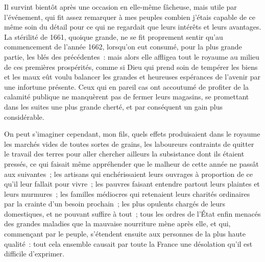 \documentclass[french,twoside]{book} %
\begin{document}
Il survint bientôt après une occasion en elle-même fâcheuse, mais utile par l’événement, qui fit assez remarquer à mes peuples combien j’étais capable de ce même soin du détail pour ce qui ne regardait que leurs intérêts et leurs avantages. La stérilité de 1661, quoique grande, ne se fit proprement sentir qu’au commencement de l’année 1662, lorsqu’on eut consumé, pour la plus grande partie, les blés des précédentes : mais alors elle affligea tout le royaume au milieu de ces premières prospérités, comme si Dieu qui prend soin de tempérer les biens et les maux eût voulu balancer les grandes et heureuses espérances de l’avenir par une infortune présente. Ceux qui en pareil cas ont accoutumé de profiter de la calamité publique ne manquèrent pas de fermer leurs magasins, se promettant dans les suites une plus grande cherté, et par conséquent un gain plus considérable.\par
On peut s’imaginer cependant, mon fils, quels effets produisaient dans le royaume les marchés vides de toutes sortes de grains, les laboureurs contraints de quitter le travail des terres pour aller chercher ailleurs la subsistance dont ils étaient pressés, ce qui faisait même appréhender que le malheur de cette année ne passât aux suivantes ; les artisans qui enchérissaient leurs ouvrages à proportion de ce qu’il leur fallait pour vivre ; les pauvres faisant entendre partout leurs plaintes et leurs murmures ; les familles médiocres qui retenaient leurs charités ordinaires par la crainte d’un besoin prochain ; les plus opulents chargés de leurs domestiques, et ne pouvant suffire à tout ; tous les ordres de l’État enfin menacés des grandes maladies que la mauvaise nourriture mène après elle, et qui, commençant par le peuple, s’étendent ensuite aux personnes de la plus haute qualité : tout cela ensemble causait par toute la France une désolation qu’il est difficile d’exprimer.\par
\end{document}
